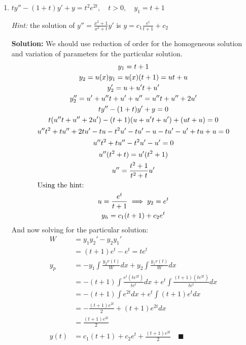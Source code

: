 \documentclass[letterpaper, fontsize=11pt]{scrartcl} %
\numberwithin{equation}{section} %
\numberwithin{figure}{section} %
\numberwithin{table}{section} %
\begin{document}
\begin{enumerate}
\begin{enumerate}
\item $ty'' -(1+t)y' +y=t^2e^{2t}, \quad t>0, \quad y_1 = t+1$
\par \textit{Hint:} the solution of $y'' = \frac{x^2+1}{x^2+t}y'$ is $y = c_1\frac{e^t}{t+1} + c_2$
\par \textbf{Solution:} We should use reduction of order for the homogeneous solution and variation of parameters for the particular solution.
\begin{gather*}
y_1 = t+1\\
y_2 = u(x)y_1 = u(x)(t+1) = ut + u\\
y_2' = u + u't + u'\\
y_2'' = u' + u''t + u' + u'' = u''t + u'' + 2u'\\
ty'' -(1+t)y' +y= 0\\
t(u''t + u'' + 2u') - (t+1)(u + u't + u') + (ut + u) = 0\\
u''t^2 + tu'' + 2tu' - tu-t^2u' -tu' - u - tu' - u' + tu + u = 0\\
u''t^2 + tu'' - t^2u' - u' = 0\\
u'' (t^2 + t) = u'(t^2 +1)\\
u'' = \frac{t^2+1}{t^2+t}u'\\
\intertext{Using the hint:}
u = \frac{e^t}{t+1} \implies y_2 = e^t\\
y_h = c_1(t+1) + c_2e^t\\
\end{gather*}
And now solving for the particular solution:
\begin{align*}
W&= y_1y_2' - y_2 y_1'\\
&= (t+1)e^t - e^t = te^t\\
y_p &= -y_1\int\frac{y_2r(t)}{W}dx  + y_2 \int\frac{y_1r(t)}{W}dx\\
&= -(t+1)\int\frac{e^t\left(te^{2t}\right)}{te^t}dx  + e^t \int\frac{(t+1)\left(te^{2t}\right)}{te^t}dx\\
&= -(t+1)\int e^{2t}dx  + e^t \int(t+1)e^{t}dx\\
&= -\frac{(t+1)e^{2t}}{2}  + (t+1)e^{2t}dx\\
&= \frac{(t+1)e^{2t}}{2} \\
y(t) &= c_1(t+1) + c_2e^t + \frac{(t+1)e^{2t}}{2}  \quad\blacksquare
\end{align*}


\end{enumerate}





\end{enumerate}
\end{document}
